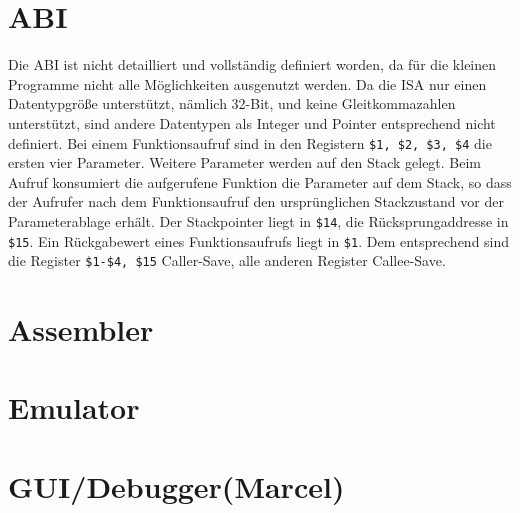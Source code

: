 
\newpage
\begin{multicols}{3}
\inputminted{nasm}{calc.s}
\end{multicols}

\newpage
\section{ABI}
Die ABI ist nicht detailliert und vollständig definiert worden, da für die kleinen Programme nicht alle Möglichkeiten ausgenutzt werden.
Da die ISA nur einen Datentypgröße unterstützt, nämlich 32-Bit, und keine Gleitkommazahlen unterstützt, sind andere Datentypen als Integer und Pointer entsprechend nicht definiert.
Bei einem Funktionsaufruf sind in den Registern \texttt{\$1, \$2, \$3, \$4} die ersten vier Parameter.
Weitere Parameter werden auf den Stack gelegt.
Beim Aufruf konsumiert die aufgerufene Funktion die Parameter auf dem Stack,
so dass der Aufrufer nach dem Funktionsaufruf den ursprünglichen Stackzustand vor der Parameterablage erhält. 
Der Stackpointer liegt in \texttt{\$14}, die Rücksprungaddresse in \texttt{\$15}.
Ein Rückgabewert eines Funktionsaufrufs liegt in \texttt{\$1}.
Dem entsprechend sind die Register \texttt{\$1-\$4, \$15} Caller-Save, alle anderen Register Callee-Save.

\section{Assembler} %

\section{Emulator} %

\section{GUI/Debugger(Marcel)}
